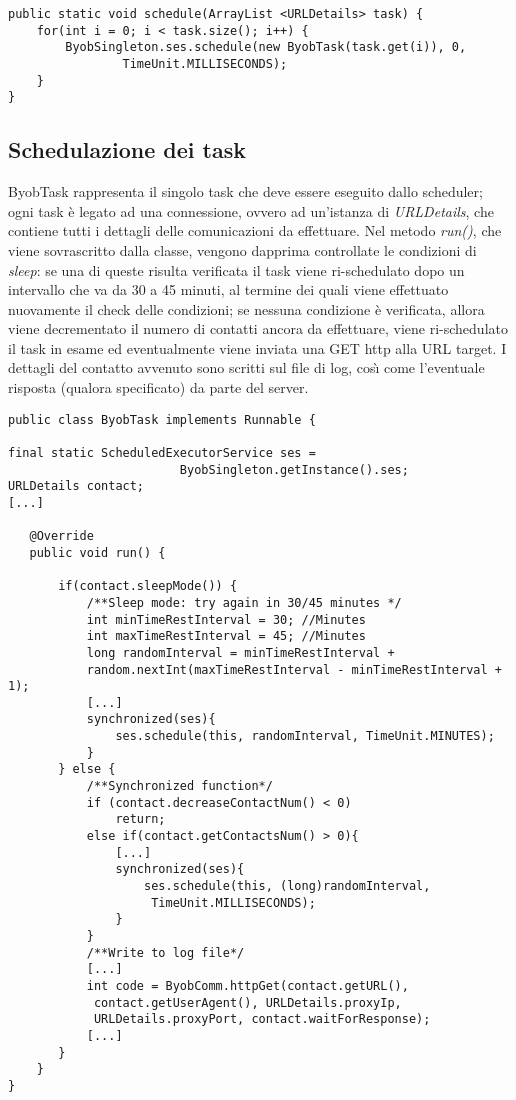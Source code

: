 \vspace{0.5cm}
\begin{lstlisting}
public static void schedule(ArrayList <URLDetails> task) {
    for(int i = 0; i < task.size(); i++) {
	    ByobSingleton.ses.schedule(new ByobTask(task.get(i)), 0,
			    TimeUnit.MILLISECONDS);
    }
}
\end{lstlisting}


\subsection{Schedulazione dei task}
ByobTask rappresenta il singolo task che deve essere eseguito dallo scheduler; ogni task \`{e} legato ad una connessione, ovvero ad un'istanza di \textit{URLDetails}, che contiene tutti i dettagli delle comunicazioni da effettuare.
Nel metodo \textit{run()}, che viene sovrascritto dalla classe, vengono dapprima controllate le condizioni di \textit{sleep}: 
se una di queste risulta verificata il task viene ri-schedulato dopo un intervallo che va da 30 a 45 minuti, al termine dei quali viene effettuato nuovamente il check delle condizioni;
se nessuna condizione \`{e} verificata, allora viene decrementato il numero di contatti ancora da effettuare, viene ri-schedulato il task in esame ed eventualmente viene inviata una GET http alla URL target.
I dettagli del contatto avvenuto sono scritti sul file di log, cos\`{\i} come l'eventuale risposta (qualora specificato) da parte del server.

\vspace{0.5cm}
\begin{lstlisting}
public class ByobTask implements Runnable {

final static ScheduledExecutorService ses = 
						ByobSingleton.getInstance().ses;
URLDetails contact;
[...]

   @Override
   public void run() {
   
	   if(contact.sleepMode()) {
		   /**Sleep mode: try again in 30/45 minutes */
		   int minTimeRestInterval = 30; //Minutes
		   int maxTimeRestInterval = 45; //Minutes
		   long randomInterval = minTimeRestInterval + 
		   random.nextInt(maxTimeRestInterval - minTimeRestInterval + 1);
		   [...]
		   synchronized(ses){
			   ses.schedule(this, randomInterval, TimeUnit.MINUTES);
		   }
	   } else {        
		   /**Synchronized function*/
		   if (contact.decreaseContactNum() < 0) 
			   return; 
		   else if(contact.getContactsNum() > 0){
			   [...]
			   synchronized(ses){
				   ses.schedule(this, (long)randomInterval,
				    TimeUnit.MILLISECONDS);
			   }
		   }
		   /**Write to log file*/
		   [...]
		   int code = ByobComm.httpGet(contact.getURL(),
		    contact.getUserAgent(), URLDetails.proxyIp, 
		    URLDetails.proxyPort, contact.waitForResponse);
	       [...]
	   }
	}
}
\end{lstlisting}

